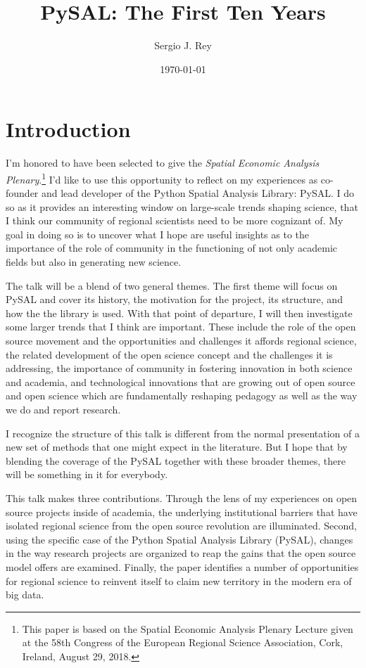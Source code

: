 \documentclass[11pt]{article}
\author{Sergio J. Rey}
\date{\today}
\title{PySAL: The First Ten Years}
\begin{document}
\maketitle
\section{Introduction}
\label{sec:org8a5fc20}

I'm honored to have been selected to give the \emph{Spatial Economic Analysis
Plenary}.\footnote{This paper is based on the Spatial Economic Analysis Plenary Lecture
given at the 58th Congress of the European Regional Science Association, Cork,
Ireland, August 29, 2018.} I'd like to use this opportunity to reflect on my experiences as
co-founder and lead developer of the Python Spatial Analysis Library: PySAL. I
do so as it provides an interesting window on large-scale trends shaping
science, that I think our community of regional scientists need to be more
cognizant of. My goal in doing so is to uncover what I hope are useful insights
as to the importance of the role of community in the functioning of not only
academic fields but also in generating new science.


The talk will be a blend of two general themes. The first theme will focus on
PySAL and cover its history, the motivation for the project, its structure, and
how the the library is used. With that point of departure, I will then
investigate some  larger trends that I think are important. These
include the role of the open source movement and the opportunities and
challenges it affords regional science, the related development of the open
science concept and the challenges it is addressing, the importance of
community in fostering innovation in both science and academia, and
technological innovations that are growing out of open source and open science
which are fundamentally reshaping pedagogy as well as the way we do and report
research.

I recognize the structure of this talk is different from the normal
presentation of a new set of methods that one might expect in the literature.
But I hope that by blending the coverage of the PySAL together with these
broader themes, there will be something in it for everybody.

This talk makes three contributions. Through the lens of my
experiences on open source projects inside of academia, the underlying
institutional barriers that have isolated regional science from the open source
revolution are illuminated. Second, using the specific case of the Python
Spatial Analysis Library (PySAL), changes in the way research projects are
organized to reap the gains that the open source model offers are examined.
Finally, the paper identifies a number of opportunities for regional science to
reinvent itself to claim new territory in the modern era of big data.
\end{document}

